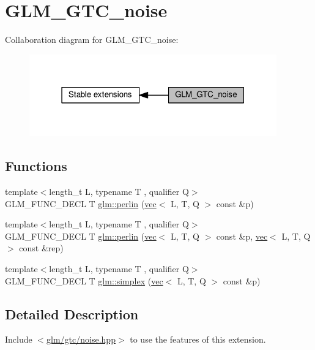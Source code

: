 \hypertarget{group__gtc__noise}{}\section{G\+L\+M\+\_\+\+G\+T\+C\+\_\+noise}
\label{group__gtc__noise}
Collaboration diagram for G\+L\+M\+\_\+\+G\+T\+C\+\_\+noise\+:
\nopagebreak
\begin{figure}[H]
\begin{center}
\leavevmode
\includegraphics[width=303pt]{d4/d38/group__gtc__noise}
\end{center}
\end{figure}
\subsection*{Functions}
\begin{DoxyCompactItemize}
\item 
{\footnotesize template$<$length\+\_\+t L, typename T , qualifier Q$>$ }\\G\+L\+M\+\_\+\+F\+U\+N\+C\+\_\+\+D\+E\+CL T \hyperlink{group__gtc__noise_ga1e043ce3b51510e9bc4469227cefc38a}{glm\+::perlin} (\hyperlink{structglm_1_1vec}{vec}$<$ L, T, Q $>$ const \&p)
\item 
{\footnotesize template$<$length\+\_\+t L, typename T , qualifier Q$>$ }\\G\+L\+M\+\_\+\+F\+U\+N\+C\+\_\+\+D\+E\+CL T \hyperlink{group__gtc__noise_gac270edc54c5fc52f5985a45f940bb103}{glm\+::perlin} (\hyperlink{structglm_1_1vec}{vec}$<$ L, T, Q $>$ const \&p, \hyperlink{structglm_1_1vec}{vec}$<$ L, T, Q $>$ const \&rep)
\item 
{\footnotesize template$<$length\+\_\+t L, typename T , qualifier Q$>$ }\\G\+L\+M\+\_\+\+F\+U\+N\+C\+\_\+\+D\+E\+CL T \hyperlink{group__gtc__noise_ga8122468c69015ff397349a7dcc638b27}{glm\+::simplex} (\hyperlink{structglm_1_1vec}{vec}$<$ L, T, Q $>$ const \&p)
\end{DoxyCompactItemize}


\subsection{Detailed Description}
Include $<$\hyperlink{noise_8hpp}{glm/gtc/noise.\+hpp}$>$ to use the features of this extension.

